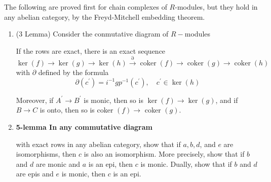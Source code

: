 \begin{prop}The following are proved first for chain complexes of $R$-modules, but they hold in any abelian category, by the Freyd-Mitchell embedding theorem.
    \begin{enumerate}
      \item (3 Lemma) Consider the conmutative diagram of $R-$modules
       \begin{center}
       \end{center}
       If the rows are exact, there is an exact sequence
       $$
       \operatorname{ker}(f) \rightarrow \operatorname{ker}(g) \rightarrow \operatorname{ker}(h) \xrightarrow{\partial} \operatorname{coker}(f) \rightarrow \operatorname{coker}(g) \rightarrow \operatorname{coker}(h)
       $$
       with $\partial$ defined by the formula
       $$
       \partial\left(c^{\prime}\right)=i^{-1} g p^{-1}\left(c^{\prime}\right), \quad c^{\prime} \in \operatorname{ker}(h)
       $$
       
       Moreover, if $A^{\prime} \rightarrow B^{\prime}$ is monic, then so is $\operatorname{ker}(f) \rightarrow \operatorname{ker}(g)$, and if $B \rightarrow C$ is onto, then so is coker $(f) \rightarrow$ coker $(g)$.
  
       \item \bf{5-lemma} In any commutative diagram
       \begin{center}
      \end{center}
       with exact rows in any abelian category, show that if $a, b, d$, and $e$ are isomorphisms, then $c$ is also an isomorphism. More precisely, show that if $b$ and $d$ are monic and $a$ is an epi, then $c$ is monic. Dually, show that if $b$ and $d$ are epis and $e$ is monic, then $c$ is an epi.
    \end{enumerate}  
  \end{prop}
  
